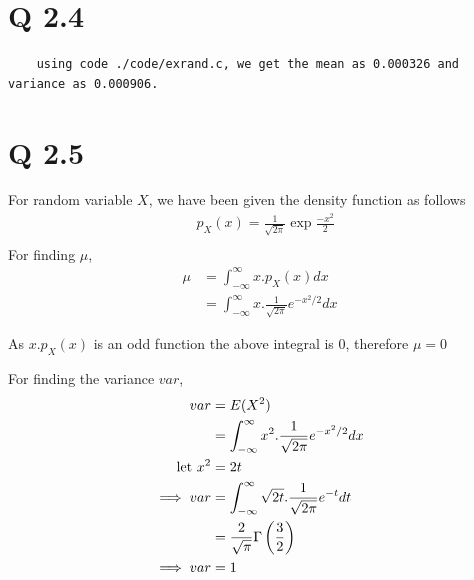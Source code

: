 \documentclass[journal,12pt,twocolumn]{IEEEtran}
\begin{document}
\section {Q 2.4}
\begin{lstlisting}
    using code ./code/exrand.c, we get the mean as 0.000326 and variance as 0.000906.
\end{lstlisting}


\section {Q 2.5}
\noindent For random variable $X$, we have been given the density function as follows
    \begin{align}
        &p_X(x) = \frac{1}{\sqrt{2\pi}}\exp{\frac{-x^2}{2}}\\
    \end{align}
For finding $\mu$,
\begin{align}
    \mu &= \int _ {- \infty} ^ {\infty} {x . p_X(x) dx} \\
    &= \int _ {- \infty} ^ {\infty} {x . \frac{1}{\sqrt{2 \pi}} e^{-x^2 / 2} dx}
\end{align}

As $x . p_X(x)$ is an odd function the above integral is $0$, therefore $\mu = 0$

For finding the variance $var$,
\begin{align}
    var &= E(X^2) \\
    &= \int _ {- \infty} ^ {\infty} {x^2 . \frac{1}{\sqrt{2 \pi}} e^{-x^2 / 2} dx} \\
    \text{let\,\,} x^2 &= 2t \\
    \implies var &= \int _ {- \infty} ^ {\infty} {\sqrt{2t} . \frac{1}{\sqrt{2\pi}} e^{-t} dt} \\
    &= \frac{2}{\sqrt{\pi}} \Gamma \left(\frac{3}{2}\right) \\
    \implies var &= 1
\end{align}
\end{document}
